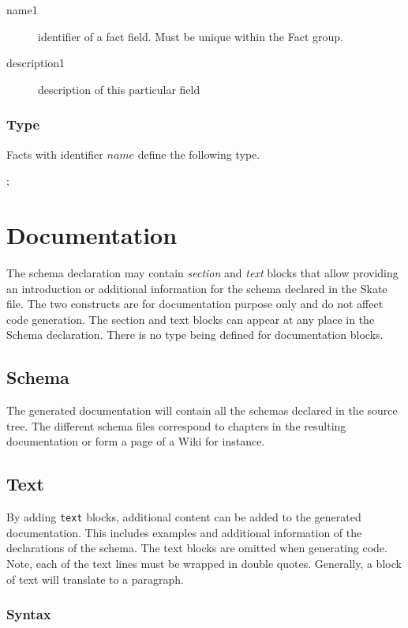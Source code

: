 \documentclass[a4paper,11pt,twoside]{report}
\begin{document}
{{\begin{description}
    \item [name1] identifier of a fact field. Must be unique within the 
                  Fact group.   
    
    \item [description1] description of this particular field
\end{description}

\subsubsection{Type}
Facts with identifier $name$ define the following type.

\begin{syntax}
 ;
\end{syntax}


\section{Documentation}

The schema declaration may contain \emph{section} and \emph{text} blocks that
allow providing an introduction or additional information for the schema 
declared in the Skate file. The two constructs are for documentation purpose 
only and do not affect code generation. The section and text blocks can appear
at any place in the Schema declaration. There is no type being defined for 
documentation blocks.

\subsection{Schema}
The generated documentation will contain all the schemas declared in the source 
tree. The different schema files correspond to chapters in the resulting 
documentation or form a page of a Wiki for instance.

\subsection{Text}
\label{sec:doc:text}

By adding \texttt{text} blocks, additional content can be added to the generated
documentation. This includes examples and additional information of the
declarations of the schema. The text blocks are omitted when generating code. 
Note, each of the text lines must be wrapped in double quotes. Generally, a 
block of text will translate to a paragraph.

\subsubsection{Syntax}

}}
\end{document}

